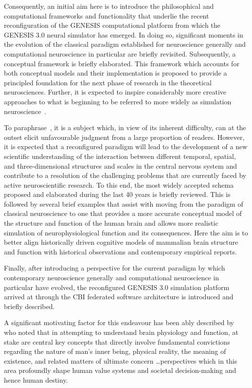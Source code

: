 \documentclass[11pt,3p,twocolumn]{JMN}
\begin{document}
Consequently, an initial aim here is to introduce the philosophical and computational frameworks and functionality that underlie the recent reconfiguration of the GENESIS computational platform from which the GENESIS 3.0 neural simulator has emerged. In doing so, significant moments in the evolution of the classical paradigm established for neuroscience generally and computational neuroscience in particular are briefly revisited. Subsequently, a conceptual framework is briefly elaborated. This framework which accounts for both conceptual models and their implementation is proposed to provide a principled foundation for the next phase of research in the theoretical neurosciences. Further, it is expected to inspire considerably more creative approaches to what is beginning to be referred to more widely as simulation neuroscience~\cite[see, for example][]{fan19}.

To paraphrase~\citet{kant08}, it is a subject which, in view of its inherent difficulty, can at the outset elicit unfavourable judgment from a large proportion of readers. However, it is expected that a reconfigured paradigm will lead to the development of a new scientific understanding of the interaction between different temporal, spatial, and three-dimensional structures and scales in the central nervous system and contribute to a resolution of the challenging problems that are currently faced by active neuroscientific research. To this end, the most widely accepted schema proposed and elaborated during the last 40 years is briefly reviewed. This is followed by several brief examples that assist with moving from the paradigm of classical neuroscience to one that provides a more accurate conceptual model of the structure and function of the human brain and allows more realistic simulation of neurophysiological function and its consequences. Here the aim is to better align historically driven cognitive models of mammalian brain structure and function with historical observations and contemporary empirical reports.

Finally, after introducing a perspective for the current paradigm by which contemporary neuroscience generally and computational neuroscience in particular have evolved, the reconfigured GENESIS 3.0 simulation platform arrived at through the CBI federated software architecture is introduced and briefly described.

A significant motivating factor for this endeavour has been ably described by~\citet{sperry80} who noted that in attempting to understand brain physiology and function, at stake are central key concepts that directly involve fundamental convictions regarding the nature of man's inner being, physical reality, the meaning of existence, and related matters of ultimate concern \ldots perspectives which in this area profoundly shape human value systems and societal decision-making and hence human destiny.
\end{document}

